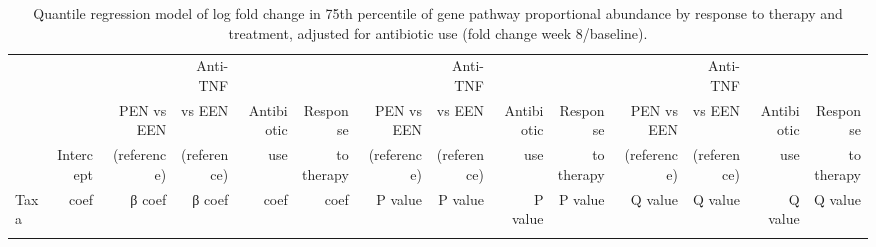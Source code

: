 \newpage
{\tiny
	\begin{landscape}
		\renewcommand{\arraystretch}{0.7} \setlength{\tabcolsep}{3pt}
		\begin{longtable}{ | l | r | r | r | r | r | r  | r | r | r | r | r | r  | r  |}
			\caption[Quantile regression model of log fold change in 75th percentile of gene pathway proportional abundance by response to therapy and treatment, adjusted for antibiotic use (fold change week 8/baseline)]{Quantile regression model of log fold change in 75th percentile of gene pathway proportional abundance by response to therapy and treatment, adjusted for antibiotic use (fold change week 8/baseline).} 
			\label{TS10} \\
			
			&  &	 &	Anti-TNF   & &	 &	  &	Anti-TNF & && 	& Anti-TNF  & 	&   \\
			
			&  &	PEN vs EEN &	vs EEN  &	Antibiotic &	Response &	 PEN vs EEN  &	vs EEN &	Antibiotic&	Response& PEN vs EEN	& vs EEN & 	Antibiotic	& Response  \\
			
			& Intercept & (reference) &	(reference) &	use & to therapy &(reference) &(reference) &	use &to therapy	&(reference)	& (reference)& use	& to therapy  \\
			\hline 
			Taxa & coef & β coef & β coef & coef & coef & P value & P value & P value & P value & Q value & Q value & Q value & Q value \\ 
			\hline 
			\endfirsthead
			
			
			\endfoot
			
			\hline 
			\endlastfoot
			

\end{longtable}
\end{landscape}}
